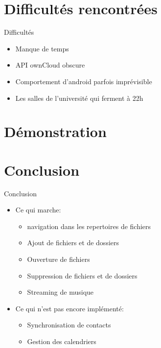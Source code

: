 \documentclass{beamer}
\begin{document}




\section{Difficultés rencontrées}
\begin{frame}{Difficultés}
	\begin{itemize}
	\item Manque de temps
	\pause
	\item API ownCloud obscure
	\pause
	\item Comportement d'android parfois imprévisible
	\pause
	\item Les salles de l'université qui ferment à 22h
	\end{itemize}
	\end{frame}


\section{Démonstration}

\section{Conclusion}
	\begin{frame}{Conclusion}
	\begin{itemize}
	\item Ce qui marche:
		\begin{itemize}
		\item navigation dans les repertoires de fichiers
		\item Ajout de fichiers et de dossiers
		\item Ouverture de fichiers
		\item Suppression de fichiers et de dossiers
		\item Streaming de musique
		\end{itemize}
	\pause
	\item Ce qui n'est pas encore implémenté:
		\begin{itemize}
		\item Synchronisation de contacts
		\item Gestion des calendriers
		\end{itemize}
	\end{itemize}
	\end{frame}
\end{document}
